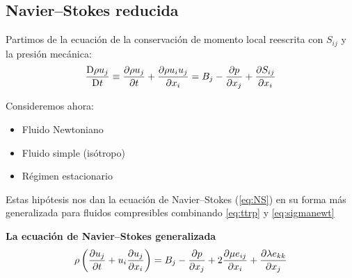 




\subsection{Navier--Stokes reducida}
Partimos de la ecuación de la conservación de momento local reescrita con $S_{ij}$ y la presión mecánica:
\begin{equation} \label{eq:NewtonSij}
    \frac{\textrm{D} \rho u_j}{\textrm{D} t}\equiv   \frac{\partial \rho u_j}{\partial t}+\frac{\partial \rho u_i u_j}{\partial x_i}=B_j-\frac{\partial p}{\partial x_j}+\frac{\partial S_{ij}}{\partial x_i}
\end{equation}

Consideremos ahora:
\begin{itemize}
\item Fluido Newtoniano
\item Fluido simple (isótropo)
\item Régimen estacionario
\end{itemize}
Estas hipótesis nos dan la ecuación de Navier--Stokes (\ref{eq:NS}) en su forma más generalizada para fluidos compresibles combinando \ref{eq:ttrp} y \ref{eq:sigmanewt}
\begin{mdframed}
\textbf{La ecuación de Navier--Stokes generalizada}
\begin{equation} \label{eq:NS}
     \rho \left( \frac{\partial u_j}{\partial t}+u_i \frac{\partial u_j}{\partial x_i}\right)=B_j-\frac{\partial p}{\partial x_j}+2\frac{\partial \mu e_{ij}}{\partial x_i}+\frac{\partial \lambda e_{kk} }{\partial x_j}
\end{equation}
\end{mdframed}

